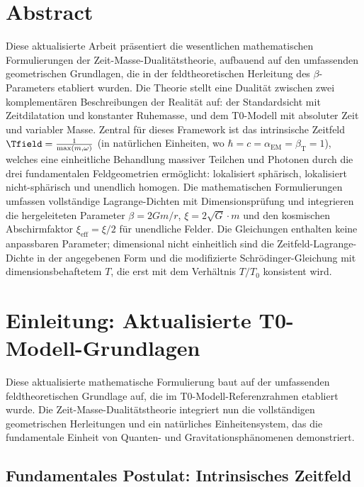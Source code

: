 \section*{Abstract}
		Diese aktualisierte Arbeit präsentiert die wesentlichen mathematischen Formulierungen der Zeit-Masse-Dualitätstheorie, aufbauend auf den umfassenden geometrischen Grundlagen, die in der feldtheoretischen Herleitung des $\beta$-Parameters etabliert wurden. Die Theorie stellt eine Dualität zwischen zwei komplementären Beschreibungen der Realität auf: der Standardsicht mit Zeitdilatation und konstanter Ruhemasse, und dem T0-Modell mit absoluter Zeit und variabler Masse. Zentral für dieses Framework ist das intrinsische Zeitfeld $\Tfield = \frac{1}{\max(m, \omega)}$ (in natürlichen Einheiten, wo $\hbar = c = \alpha_{\text{EM}} = \beta_{\text{T}} = 1$), welches eine einheitliche Behandlung massiver Teilchen und Photonen durch die drei fundamentalen Feldgeometrien ermöglicht: lokalisiert sphärisch, lokalisiert nicht-sphärisch und unendlich homogen. Die mathematischen Formulierungen umfassen vollständige Lagrange-Dichten mit Dimensionsprüfung und integrieren die hergeleiteten Parameter $\beta = 2Gm/r$, $\xi = 2\sqrt{G} \cdot m$ und den kosmischen Abschirmfaktor $\xi_{\text{eff}} = \xi/2$ für unendliche Felder. Die Gleichungen enthalten keine anpassbaren Parameter; dimensional nicht einheitlich sind die Zeitfeld-Lagrange-Dichte in der angegebenen Form und die modifizierte Schrödinger-Gleichung mit dimensionsbehaftetem $T$, die erst mit dem Verhältnis $T/T_0$ konsistent wird.

	
	
	\section{Einleitung: Aktualisierte T0-Modell-Grundlagen}
	
	Diese aktualisierte mathematische Formulierung baut auf der umfassenden feldtheoretischen Grundlage auf, die im T0-Modell-Referenzrahmen etabliert wurde. Die Zeit-Masse-Dualitätstheorie integriert nun die vollständigen geometrischen Herleitungen und ein natürliches Einheitensystem, das die fundamentale Einheit von Quanten- und Gravitationsphänomenen demonstriert.
	
	\subsection{Fundamentales Postulat: Intrinsisches Zeitfeld}
	\label{subsec:fundamentales_postulat}
	
